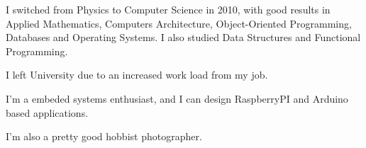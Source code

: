 \documentclass[10pt,a4paper]{altacv}
\begin{document}
\smallskip

I switched from Physics to Computer Science in 2010, with good results in Applied Mathematics, Computers Architecture, Object-Oriented Programming, Databases and Operating Systems. I also studied Data Structures and Functional Programming.

\smallskip

I left University due to an increased work load from my job.

I'm a embeded systems enthusiast, and I can design RaspberryPI and Arduino based applications.

\smallskip

I'm also a pretty good hobbist photographer.
\end{document}

